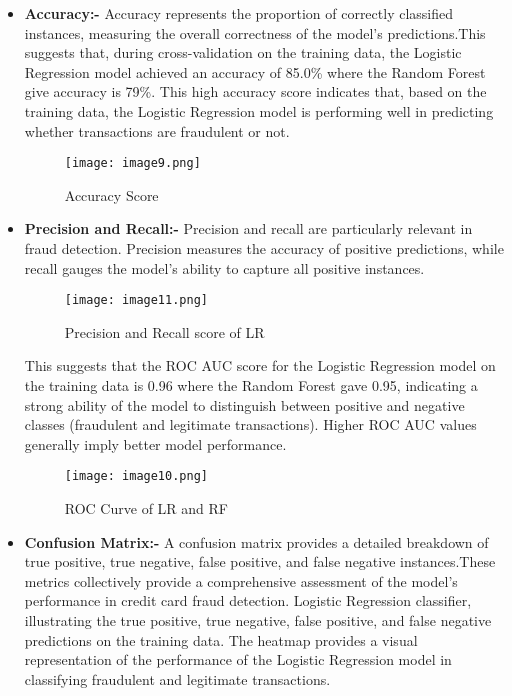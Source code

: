 \begin{itemize}

    \item \textbf{Accuracy:-} Accuracy represents the proportion of correctly classified instances, measuring the overall correctness of the model's predictions.This suggests that, during cross-validation on the training data, the Logistic Regression model achieved an accuracy of 85.0\% where the Random Forest give accuracy is 79\%. This high accuracy score indicates that, based on the training data, the Logistic Regression model is performing well in predicting whether transactions are fraudulent or not.

 \begin{figure}[h]
     \centering
     \texttt{[image: image9.png]}
     \caption{Accuracy Score}
     \label{fig:enter-label}
 \end{figure}
 
    \item \textbf{Precision and Recall:-} Precision and recall are particularly relevant in fraud detection. Precision measures the accuracy of positive predictions, while recall gauges the model's ability to capture all positive instances.\medskip
    
    \begin{figure}[h]
        \centering
        \texttt{[image: image11.png]}
        \caption{Precision and Recall score of LR}
        \label{fig:enter-label}
    \end{figure}
    
    This suggests that the ROC AUC score for the Logistic Regression model on the training data is 0.96 where the Random Forest gave 0.95, indicating a strong ability of the model to distinguish between positive and negative classes (fraudulent and legitimate transactions). Higher ROC AUC values generally imply better model performance.
    
    \begin{figure}[h]
        \centering
        \texttt{[image: image10.png]}
        \caption{ROC Curve of LR and RF}
        \label{fig:enter-label}
    \end{figure}

    \item \textbf{Confusion Matrix:-} A confusion matrix provides a detailed breakdown of true positive, true negative, false positive, and false negative instances.These metrics collectively provide a comprehensive assessment of the model's performance in credit card fraud detection.\medskip
     Logistic Regression classifier, illustrating the true positive, true negative, false positive, and false negative predictions on the training data. The heatmap provides a visual representation of the performance of the Logistic Regression model in classifying fraudulent and legitimate transactions.
     

\end{itemize}

